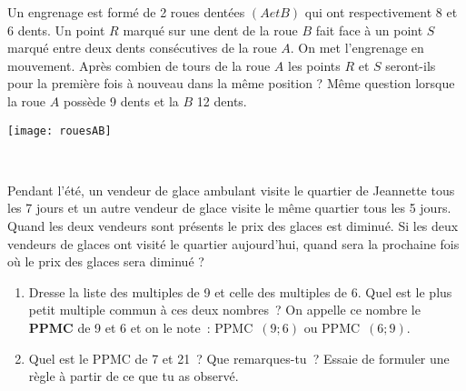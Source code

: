 
\begin{activite}

\begin{partie}
 \begin{minipage}[c]{0.6\textwidth}
Un engrenage est formé de 2 roues dentées $(A et B)$ qui ont respectivement 8 et 6 dents. Un point $R$ marqué sur une dent de la roue $B$ fait face à un point $S$ marqué entre deux dents consécutives de la roue $A$. On met l'engrenage en mouvement. Après combien de tours de la roue $A$ les points $R$ et $S$ seront-ils pour la première fois à nouveau dans la même position ? Même question lorsque la roue $A$ possède 9 dents et la $B$ 12 dents.
 \end{minipage} \hfill%
 \begin{minipage}[c]{0.2\textwidth}
  \texttt{[image: rouesAB]}
  \end{minipage} \\
\end{partie}

\begin{partie}
Pendant l'été, un vendeur de glace ambulant visite le quartier de Jeannette tous les 7 jours et un autre vendeur de glace visite le même quartier tous les 5 jours. Quand les deux vendeurs sont présents le prix des glaces est diminué. Si les deux vendeurs de glaces ont visité le quartier aujourd'hui, quand sera la prochaine fois où le prix des glaces sera diminué ?
\end{partie}

\begin{partie}[PPMC]
\begin{enumerate}
 \item Dresse la liste des multiples de 9 et celle des multiples de 6. Quel est le plus petit multiple commun à ces deux nombres ? On appelle ce nombre le \textbf{PPMC} de 9 et 6 et on le note : PPMC $(9 ; 6)$ ou PPMC $(6 ; 9)$.
 \item Quel est le PPMC de 7 et 21 ? Que remarques-tu ? Essaie de formuler une règle à partir de ce que tu as observé.
 \end{enumerate}
\end{partie}

\end{activite}


